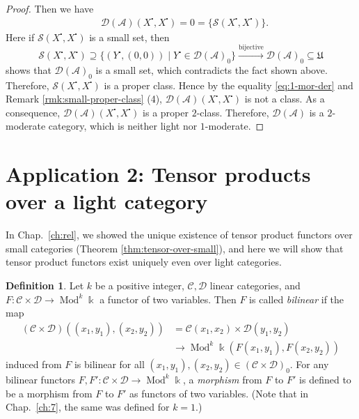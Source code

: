 \documentclass{surv-l}
\numberwithin{equation}{chapter}
\numberwithin{figure}{chapter}
\theoremstyle{plain}
\theoremstyle{definition}
\newtheorem{dfn}[thm]{Definition}
\theoremstyle{remark}
\DeclareMathOperator{\Mod}{Mod}
\begin{document}
\begin{proof}
Then we have
\begin{equation}\label{eq:1-mor-der}
\begin{aligned}
&{\mathcal{D}}(\mathcal{A})(X^{\centerdot}, X^{\centerdot}) = 0 = \{\mathcal{S}(X^{\centerdot}, X^{\centerdot})\}.
\end{aligned}
\end{equation}
Here if $\mathcal{S}(X^{\centerdot}, X^{\centerdot})$ is a small set, then
\[
\mathcal{S}(X^{\centerdot}, X^{\centerdot}) \supseteq \{(Y^{\centerdot}, (0,0)) \mid Y^{\centerdot} \in {\mathcal{D}}(\mathcal{A})_0\} \xrightarrow{\text{bijective}} {\mathcal{D}}(\mathcal{A})_0 \subseteq \mathfrak{U}
\]
shows that ${\mathcal{D}}(\mathcal{A})_0$ is a small set, which contradicts the fact shown above.
Therefore, $\mathcal{S}(X^{\centerdot}, X^{\centerdot})$ is a proper class.
Hence by the equality \ref{eq:1-mor-der} and Remark \ref{rmk:small-proper-class} (4),
${\mathcal{D}}(\mathcal{A})(X^{\centerdot}, X^{\centerdot})$ is not  a class.
As a consequence, ${\mathcal{D}}(\mathcal{A})(X^{\centerdot}, X^{\centerdot})$ is a proper $2$-class.
Therefore, ${\mathcal{D}}(\mathcal{A})$ is a $2$-moderate category,
which is neither light nor $1$-moderate.
\end{proof}

\section{Application 2: Tensor products over a light category}\label{app:a.6}
In Chap.\ \ref{ch:rel}, we showed the unique existence
of tensor product functors over small categories (Theorem \ref{thm:tensor-over-small}),
and here we will show that tensor product functors exist uniquely even over light categories.

\begin{dfn}
Let $k$ be a positive integer, ${\mathcal{C}}, {\mathcal{D}}$ linear categories, and
$F \colon {\mathcal{C}} \times {\mathcal{D}} \to \Mod^k \Bbbk$ a functor of two variables.
Then $F$ is called \emph{bilinear} if
the map
\[
\begin{aligned}
({\mathcal{C}} \times {\mathcal{D}})((x_1, y_1), (x_2, y_2)) &= {\mathcal{C}}(x_1, x_2) \times {\mathcal{D}}(y_1, y_2)\\
 &\to \Mod^k \Bbbk (F(x_1, y_1), F(x_2, y_2))
\end{aligned}
\]
induced from $F$ is bilinear
for all $(x_1, y_1), (x_2, y_2) \in ({\mathcal{C}} \times {\mathcal{D}})_0$.
For any bilinear functors $F, F' \colon {\mathcal{C}} \times {\mathcal{D}} \to \Mod^k \Bbbk$,
a \emph{morphism} from $F$ to $F'$ is defined to be
a morphism from $F$ to $F'$ as functors of two variables.
(Note that in Chap.\ \ref{ch:7}, the same was defined for $k = 1$.)\end{dfn}
\end{document}
